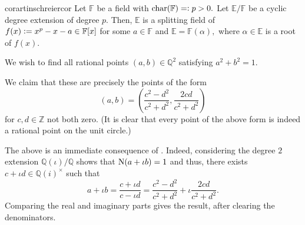 \begin{restatable}{cor}{artinschreiercor}
\label{cor:artinschreiercor}
	Let $\mathbb{F}$ be a field with $\operatorname{char}(\mathbb{F}) =\vcentcolon p > 0.$ Let $\mathbb{E}/\mathbb{F}$ be a cyclic degree extension of degree $p.$ Then, $\mathbb{E}$ is a splitting field of $f(x) \vcentcolon= x^p - x - a \in \mathbb{F}[x]$ for some $a \in \mathbb{F}$ and $\mathbb{E} = \mathbb{F}(\alpha),$ where $\alpha \in \mathbb{E}$ is a root of $f(x).$ \hfill\hyperref[cor:artinschreiercor2]{\downsym}
\end{restatable}

\begin{ex}
	We wish to find all rational points $(a, b) \in \mathbb{Q}^2$ satisfying $a^2 + b^2 = 1.$ 

	We claim that these are precisely the points of the form
	\begin{equation*} 
		(a, b) = \left(\frac{c^2 - d^2}{c^2 + d^2}, \frac{2cd}{c^2 + d^2}\right)
	\end{equation*}
	for $c, d \in \mathbb{Z}$ not both zero. (It is clear that every point of the above form is indeed a rational point on the unit circle.)

	The above is an immediate consequence of . Indeed, considering the degree $2$ extension $\mathbb{Q}(\iota)/\mathbb{Q}$ shows that $\operatorname{N}(a + \iota b) = 1$ and thus, there exists $c + \iota d \in \mathbb{Q}(i)^\times$ such that
	\begin{equation*} 
		a + \iota b = \frac{c + \iota d}{c - \iota d} = \frac{c^2 - d^2}{c^2 + d^2} + \iota \frac{2cd}{c^2 + d^2}.
	\end{equation*}
	Comparing the real and imaginary parts gives the result, after clearing the denominators.
\end{ex}